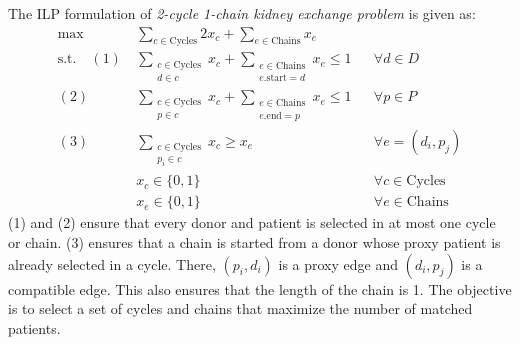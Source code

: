 The ILP formulation of \textit{2-cycle 1-chain kidney exchange problem} is given as:
\begin{align*}
\max\quad & \sum_{c \in \text{Cycles}} 2x_c + \sum_{e \in \text{Chains}} x_e \\
\text{s.t.}\quad 
 (1)\: & \sum_{\substack{c \in \text{Cycles} \\ d \in c}} x_c + \sum_{\substack{e \in \text{Chains} \\ e.\text{start} = d}} x_e \le 1 && \forall d \in D \\
(2)\: & \sum_{\substack{c \in \text{Cycles} \\ p \in c}} x_c + \sum_{\substack{e \in \text{Chains} \\ e.\text{end} = p}} x_e \le 1 && \forall p \in P \\
(3)\: & \sum_{\substack{c \in \text{Cycles} \\ p_i \in c}} x_c \ge x_e && \forall e = (d_i, p_j) \\
& x_c \in \{0, 1\} && \forall c \in \text{Cycles} \\
& x_e \in \{0, 1\} && \forall e \in \text{Chains}
\end{align*}
\noindent
(1) and (2) ensure that every donor and patient is selected in at most one cycle or chain.
(3) ensures that a chain is started from a donor whose proxy patient is already selected in a cycle. There, $(p_i,d_i)$ is a proxy edge and $(d_i,p_j)$ is a compatible edge. This also ensures that the length of the chain is 1. The objective is to select a set of cycles and chains that maximize the number of matched patients.

